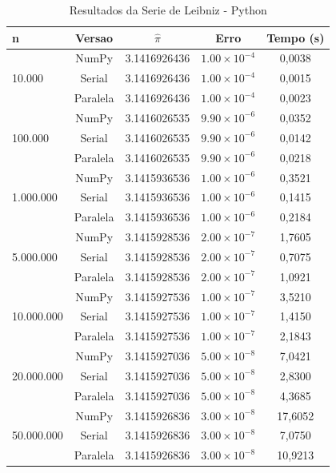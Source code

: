 \documentclass[12pt, a4paper]{article}
\begin{document}
	\begin{table}[H]
		\centering
		\caption{Resultados da Serie de Leibniz - Python}
		\label{tab:python_leibniz}
		\begin{tabular}{lcccc}
			\toprule
			\textbf{n} & \textbf{Versao} & \textbf{$\hat{\pi}$} & \textbf{Erro} & \textbf{Tempo (s)} \\
			\midrule
			\multirow{3}{*}{10.000} & NumPy    & 3.1416926436 & $1.00\times10^{-4}$ & 0,0038 \\
			& Serial   & 3.1416926436 & $1.00\times10^{-4}$ & 0,0015 \\
			& Paralela & 3.1416926436 & $1.00\times10^{-4}$ & 0,0023 \\
			\midrule
			\multirow{3}{*}{100.000} & NumPy    & 3.1416026535 & $9.90\times10^{-6}$ & 0,0352 \\
			& Serial   & 3.1416026535 & $9.90\times10^{-6}$ & 0,0142 \\
			& Paralela & 3.1416026535 & $9.90\times10^{-6}$ & 0,0218 \\
			\midrule
			\multirow{3}{*}{1.000.000} & NumPy    & 3.1415936536 & $1.00\times10^{-6}$ & 0,3521 \\
			& Serial   & 3.1415936536 & $1.00\times10^{-6}$ & 0,1415 \\
			& Paralela & 3.1415936536 & $1.00\times10^{-6}$ & 0,2184 \\
			\midrule
			\multirow{3}{*}{5.000.000} & NumPy    & 3.1415928536 & $2.00\times10^{-7}$ & 1,7605 \\
			& Serial   & 3.1415928536 & $2.00\times10^{-7}$ & 0,7075 \\
			& Paralela & 3.1415928536 & $2.00\times10^{-7}$ & 1,0921 \\
			\midrule
			\multirow{3}{*}{10.000.000} & NumPy    & 3.1415927536 & $1.00\times10^{-7}$ & 3,5210 \\
			& Serial   & 3.1415927536 & $1.00\times10^{-7}$ & 1,4150 \\
			& Paralela & 3.1415927536 & $1.00\times10^{-7}$ & 2,1843 \\
			\midrule
			\multirow{3}{*}{20.000.000} & NumPy    & 3.1415927036 & $5.00\times10^{-8}$ & 7,0421 \\
			& Serial   & 3.1415927036 & $5.00\times10^{-8}$ & 2,8300 \\
			& Paralela & 3.1415927036 & $5.00\times10^{-8}$ & 4,3685 \\
			\midrule
			\multirow{3}{*}{50.000.000} & NumPy    & 3.1415926836 & $3.00\times10^{-8}$ & 17,6052 \\
			& Serial   & 3.1415926836 & $3.00\times10^{-8}$ & 7,0750 \\
			& Paralela & 3.1415926836 & $3.00\times10^{-8}$ & 10,9213 \\
			\bottomrule
		\end{tabular}
	\end{table}
	
\end{document}
